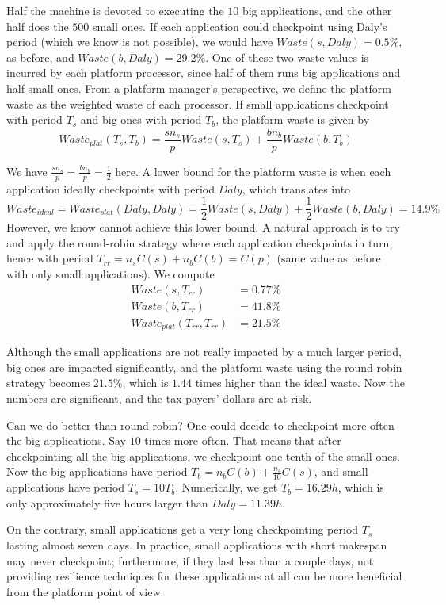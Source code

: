 \documentclass{article}
\newcommand{\ema}[1]{\ensuremath{#1}}
\newcommand{\Waste}{\ema{\mathit{Waste}}\xspace}
\newcommand{\Daly}{\ema{\mathit{Daly}}\xspace}
\begin{document}
Half the machine is devoted to executing the $10$ big applications, and the other half
does the $500$ small ones.
If each application could checkpoint using Daly's period (which we know
is not possible), we would have $Waste(s, \Daly) = 0.5\%$, as before,
and $Waste(b, \Daly) = 29.2\%$. One of these two waste values is incurred 
by each platform processor, since half of them runs big applications and half small ones.
From a platform manager's perspective, we 
define the platform waste as the weighted waste of each processor. If small applications checkpoint with period $T_{s}$ and big ones with period $T_{b}$, the
platform waste is given by
$$\Waste_{plat}(T_s, T_b) = \frac{s n_{s}}{p}\Waste(s, T_s) + \frac{b n_{b}}{p}\Waste(b, T_b)$$

We have $\frac{s n_{s}}{p} = \frac{b n_{b}}{p} = \frac{1}{2}$ here.
A lower bound for the platform waste is when each application ideally checkpoints 
with period \Daly, which translates into 
$$\Waste_{ideal} = \Waste_{plat}(\Daly, \Daly) = \frac{1}{2} \Waste(s, \Daly) + \frac{1}{2} \Waste(b, \Daly) = 14.9\%$$
However, we know cannot achieve this lower bound. A natural approach is to try and
 apply the round-robin strategy where each application checkpoints in turn, 
 hence with period $T_{rr} = n_{s}C(s) + n_{b}C(b) =  C(p)$ (same value as before
 with only small applications). We compute
$$
\begin{array}{rl}
\Waste(s, T_{rr}) &= 0.77\%\\
\Waste(b, T_{rr}) &= 41.8\%\\
\Waste_{plat}(T_{rr}, T_{rr}) & = 21.5\%
\end{array}
$$

Although the small applications are not really impacted by a much larger period, big ones are impacted significantly, and  the platform waste using the round robin strategy becomes
$21.5\%$, which is $1.44$ times higher than the ideal waste. Now the numbers are significant, and the tax payers' dollars are at risk.

Can we do better than round-robin?
One could decide to checkpoint more often the big applications. Say $10$ times more often.
That means that after checkpointing all the big applications, we checkpoint one tenth of
the small ones. Now the big applications have period $T_{b} =  n_b C(b) + \frac{n_{s}}{10}C(s)$, and small applications have period $T_{s} = 10 T_{b}$. Numerically, we get
$T_{b} = 16.29h$, which is only approximately five hours larger than $\Daly = 11.39h$.

On the contrary, small applications get a very long checkpointing period  $T_{s}$ lasting almost seven days. In practice, small applications with short makespan may never checkpoint;
furthermore, if they last less than a couple days, not providing resilience techniques for these applications at all can be more beneficial from the platform point of view.
\end{document}
